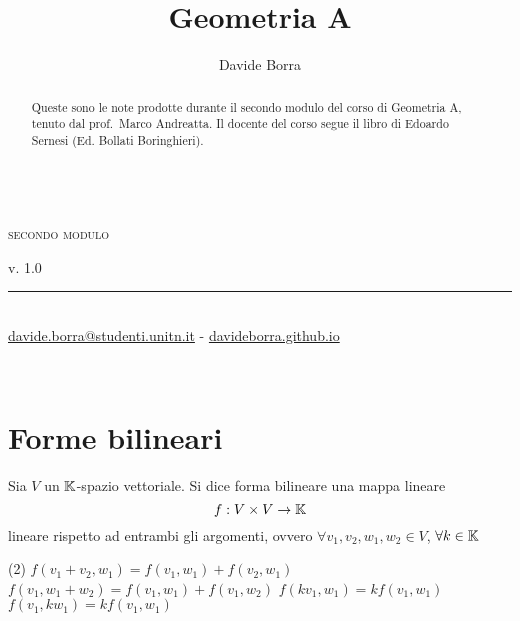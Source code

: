 \documentclass{article}     %
\title{Geometria A}
\author{Davide Borra}
\date{}
\makeatletter
\let\runauthor\@author
\let\runtitle\@title
\makeatother
\begin{document}
\lhead{}
\chead{}
\rfoot{\runauthor}

\begin{titlepage}
    \pagestyle{empty}
    \begin{center}
        \vspace*{\fill}
        \vspace{0.5cm}
        \textbf{\Huge \runtitle}\\\textsc{secondo modulo}\\\vspace{5mm}
        \textsc{\Large \runauthor}
        \vspace{5cm}
    \end{center}
    \vspace*{\fill}
    v. 1.0\\
    \rule{0.8\linewidth}{0.5mm}\\
    {\footnotesize\href{mailto:davide.borra@studenti.unitn.it}{davide.borra@studenti.unitn.it} - \href{http://davideborra.github.io}{davideborra.github.io}}
    \restoregeometry\newpage
    \thispagestyle{empty}
    \begin{abstract}
        \centering Queste sono le note prodotte durante il secondo modulo del corso di Geometria A, tenuto dal prof.~Marco Andreatta. Il docente del corso segue il libro  di Edoardo Sernesi (Ed. Bollati Boringhieri).
    \end{abstract}
    \tableofcontents
    \creativecommons
    
    
\end{titlepage}
    \lhead{\runtitle}\
    \chead{}
    \rhead{\rightmark}
    \rfoot{\runauthor}

\section{Forme bilineari}
\begin{boxdef}
    Sia $V$ un $\mathbb{K}$-spazio vettoriale. Si dice forma bilineare una mappa lineare
    \[f:V\times V\to \mathbb{K}\]
    lineare rispetto ad entrambi gli argomenti, ovvero $\forall v_1, v_2, w_1, w_2 \in V$, $\forall k\in \mathbb{K}$
    \begin{tasks}(2)
        \task[\textbullet] $f(v_1+v_2, w_1)=f(v_1,w_1)+f(v_2,w_1)$
        \task[\textbullet] $f(v_1, w_1+w_2)=f(v_1,w_1)+f(v_1,w_2)$
        \task[\textbullet] $f(kv_1, w_1)=kf(v_1,w_1)$
        \task[\textbullet] $f(v_1, kw_1)=kf(v_1,w_1)$
    \end{tasks}
\end{boxdef}
\end{document}
